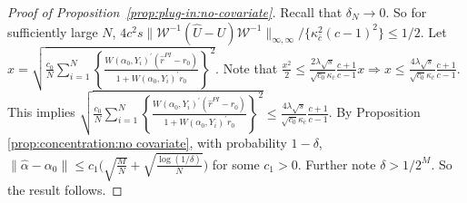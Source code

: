\documentclass[11pt]{article}
\begin{document}
\begin{proof}[Proof of Proposition~\ref{prop:plug-in:no-covariate}]
Recall that $\delta_N\rightarrow0$. So for sufficiently large $N$, $4c^2s\|\mathcal{W}^{-1}(\hat U - U)\mathcal{W}^{-1} \|_{\infty,\infty}/\{\kappa_{\bar{c}}^2(c-1)^2\}\leq1/2$. Let $x=\sqrt{\frac{c_0}{N}\sum_{i=1}^N\left\{\frac{W(\alpha_0,Y_i)^\prime(\hat{r}^{PI}-r_0)}{1+W(\alpha_0,Y_i)^\prime r_0}\right\}^2}$. Note that $\frac{x^2}{2} \leq \frac{2\lambda\sqrt{s}}{\sqrt{c_0}\kappa_{\bar{c}}}\frac{c+1}{c-1} x \Rightarrow x \leq \frac{4\lambda\sqrt{s}}{\sqrt{c_0}\kappa_{\bar{c}}}\frac{c+1}{c-1}$. This implies 
$\sqrt{\frac{c_0}{N} \sum_{i=1}^N\left\{\frac{W(\alpha_0,Y_i)^\prime(\hat{r}^{PI}-r_0)}{1+W(\alpha_0,Y_i)^\prime r_0}\right\}^2}\leq\frac{4\lambda\sqrt{s}}{\sqrt{c_0}\kappa_{\bar{c}}}\frac{c+1}{c-1}$. By Proposition \ref{prop:concentration:no covariate}, with probability $1-\delta$, $\|\hat{\alpha}-\alpha_0\|\leq c_1\big(\sqrt{\frac{M}{N}}+\sqrt{\frac{\log(1/\delta)}{N}}\big)$ for some $c_1>0$. Further note $\delta>1/2^M$. So the result follows. 
\end{proof}
\medskip
\end{document}
